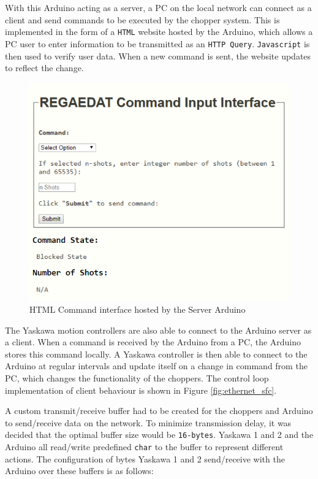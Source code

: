 \documentclass{article}
\begin{document}
            With this Arduino acting as a server, a PC on the local network can connect as a client and send commands to be executed by the chopper system. This is implemented in the form of a \texttt{HTML} website hosted by the Arduino, which allows a PC user to enter information to be transmitted as an \texttt{HTTP Query}. \texttt{Javascript} is then used to verify user data. When a new command is sent, the website updates to reflect the change.
        
            \begin{figure}[h]
                \centering
                \includegraphics[scale=0.65]{img/command_interface}
                \caption{HTML Command interface hosted by the Server Arduino}
                \label{fig:command_interface}
            \end{figure}
            
            The Yaskawa motion controllers are also able to connect to the Arduino server as a client. When a command is received by the Arduino from a PC, the Arduino stores this command locally. A Yaskawa controller is then able to connect to the Arduino at regular intervals and update itself on a change in command from the PC, which changes the functionality of the choppers. The control loop implementation of client behaviour is shown in Figure \ref{fig:ethernet_sfc}.
            
            A custom transmit/receive buffer had to be created for the choppers and Arduino to send/receive data on the network. To minimize transmission delay, it was decided that the optimal buffer size would be \texttt{16-bytes}. Yaskawa 1 and 2 and the Arduino all read/write predefined \texttt{char} to the buffer to represent different actions. The configuration of bytes Yaskawa 1 and 2 send/receive with the Arduino over these buffers is as follows:
            
\end{document}
